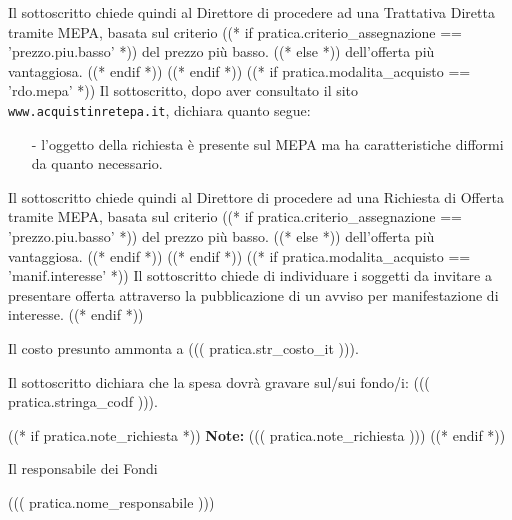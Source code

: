 \documentclass[a4paper,12pt]{letter}
\begin{document}
Il sottoscritto chiede quindi al Direttore di procedere ad una Trattativa Diretta
tramite MEPA, basata sul criterio %
   ((* if pratica.criterio_assegnazione == 'prezzo.piu.basso' *)) %
del prezzo pi\`u basso.
   ((* else *)) %
dell'offerta pi\`u vantaggiosa.
   ((* endif *))
((* endif *))
((* if pratica.modalita_acquisto == 'rdo.mepa' *))
Il sottoscritto, dopo aver consultato il sito {\tt www.acquistinretepa.it},
dichiara quanto segue:

\begin{itemize}
\item[-] l'oggetto della richiesta \`e presente sul MEPA ma ha caratteristiche difformi
da quanto necessario.
\end{itemize}

Il sottoscritto chiede quindi al Direttore di procedere ad una Richiesta di Offerta
tramite MEPA, basata sul criterio %
   ((* if pratica.criterio_assegnazione == 'prezzo.piu.basso' *)) %
del prezzo pi\`u basso.
   ((* else *)) %
dell'offerta pi\`u vantaggiosa.
   ((* endif *))
((* endif *))
((* if pratica.modalita_acquisto == 'manif.interesse' *))
Il sottoscritto chiede di individuare i soggetti da invitare a presentare offerta
attraverso la pubblicazione di un avviso per manifestazione di interesse.
((* endif *))

Il costo presunto ammonta a ((( pratica.str_costo_it ))).

Il sottoscritto dichiara che la spesa dovr\`a gravare sul/sui fondo/i:
((( pratica.stringa_codf ))). 

((* if pratica.note_richiesta *))
{\bf Note:} ((( pratica.note_richiesta )))
((* endif *))

\vspace{0.5cm}

\begin{flushright}
\begin{minipage}[c]{6cm}
Il responsabile dei Fondi

((( pratica.nome_responsabile )))

\end{minipage}
\end{flushright}
\end{document}
